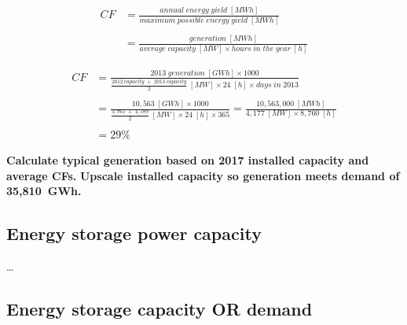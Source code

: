 







	\begin{equation}\label{eq:CF}
		\begin{split}
			CF & = \frac{annual\;energy\;yield\;[MWh]}{maximum\;possible\;energy\;yield\;[MWh]} \\
			& \\
			& = \frac{generation\;[MWh]}{average\;capacity\;[MW] \times hours\;in\;the\;year\;[h]}
		\end{split}
	\end{equation}

	\begin{equation}\label{eq:CF_example}
		\begin{split}
			CF & = \frac{2013\;generation\;[GWh] \times 1000}{\frac{2012\;capacity\;+\;2013\;capacity}{2}\;[MW] \times 24\;[h] \times days\;in\;2013} \\
			& \\
			& = \frac{10,563\;[GWh] \times 1000}{\frac{3,765\;+\;4,589}{2}\;[MW] \times 24\;[h] \times 365} = \frac{10,563,000\;[MWh]}{4,177\;[MW] \times 8,760\;[h]} \\
			& \\
			& = 29\%
		\end{split}
	\end{equation}

\textbf{Calculate typical generation based on 2017 installed capacity and average CFs.}
\textbf{Upscale installed capacity so generation meets demand of 35,810~GWh.}






\subsection{Energy storage power capacity}

\ldots




\subsection{Energy storage capacity OR demand}